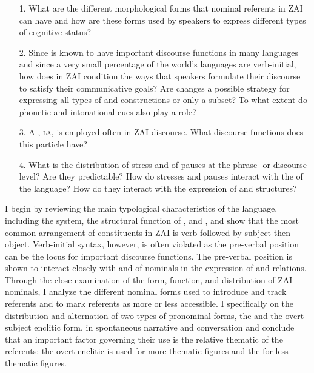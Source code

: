 \begin{itemize}
\item[1.] What are the different morphological forms that nominal referents in ZAI can have and how are these forms used by speakers to express different types of cognitive status?
\item[2.] Since  is known to have important discourse functions in many languages and since a very small percentage of the world's languages are verb-initial, how does  in ZAI condition the ways that speakers formulate their discourse to satisfy their communicative goals? Are  changes a possible strategy for expressing all types of  and  constructions or only a subset? To what extent do phonetic and intonational cues also play a role?
\item[3.] A , \textsc{la}, is employed often in ZAI discourse. What discourse functions does this particle have?
\item[4.] What is the distribution of stress and of pauses at the phrase- or discourse-level? Are they predictable? How do stresses and pauses interact with the  of the language? How do they interact with the expression of  and  structures?
\end{itemize}

I begin by reviewing the main typological characteristics of the language, including the  system, the structural function of , and , and show that the most common arrangement of constituents in ZAI is verb followed by subject then object. Verb-initial syntax, however, is often violated as the pre-verbal position can be the locus for important discourse functions. The pre-verbal position is shown to interact closely with  and  of nominals in the expression of  and  relations. Through the close examination of the form, function, and distribution of ZAI nominals, I analyze the different nominal forms used to introduce and track referents and to mark referents as more or less accessible. I  specifically on the distribution and alternation of two types of  pronominal forms, the  and the overt subject enclitic form, in spontaneous narrative and conversation and conclude that an important factor governing their use is the relative thematic  of the referents: the overt enclitic is used for more thematic figures and the  for less thematic figures. 

